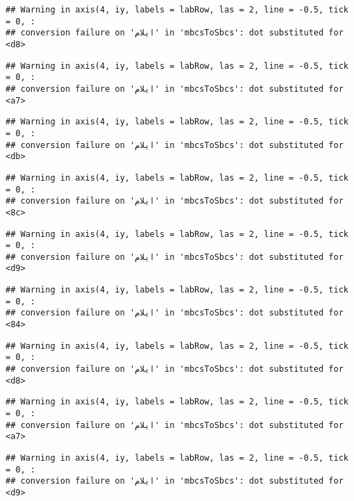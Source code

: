 \documentclass[
]{article}
\begin{document}
\begin{verbatim}
## Warning in axis(4, iy, labels = labRow, las = 2, line = -0.5, tick = 0, :
## conversion failure on 'ایلام' in 'mbcsToSbcs': dot substituted for <d8>
\end{verbatim}

\begin{verbatim}
## Warning in axis(4, iy, labels = labRow, las = 2, line = -0.5, tick = 0, :
## conversion failure on 'ایلام' in 'mbcsToSbcs': dot substituted for <a7>
\end{verbatim}

\begin{verbatim}
## Warning in axis(4, iy, labels = labRow, las = 2, line = -0.5, tick = 0, :
## conversion failure on 'ایلام' in 'mbcsToSbcs': dot substituted for <db>
\end{verbatim}

\begin{verbatim}
## Warning in axis(4, iy, labels = labRow, las = 2, line = -0.5, tick = 0, :
## conversion failure on 'ایلام' in 'mbcsToSbcs': dot substituted for <8c>
\end{verbatim}

\begin{verbatim}
## Warning in axis(4, iy, labels = labRow, las = 2, line = -0.5, tick = 0, :
## conversion failure on 'ایلام' in 'mbcsToSbcs': dot substituted for <d9>
\end{verbatim}

\begin{verbatim}
## Warning in axis(4, iy, labels = labRow, las = 2, line = -0.5, tick = 0, :
## conversion failure on 'ایلام' in 'mbcsToSbcs': dot substituted for <84>
\end{verbatim}

\begin{verbatim}
## Warning in axis(4, iy, labels = labRow, las = 2, line = -0.5, tick = 0, :
## conversion failure on 'ایلام' in 'mbcsToSbcs': dot substituted for <d8>
\end{verbatim}

\begin{verbatim}
## Warning in axis(4, iy, labels = labRow, las = 2, line = -0.5, tick = 0, :
## conversion failure on 'ایلام' in 'mbcsToSbcs': dot substituted for <a7>
\end{verbatim}

\begin{verbatim}
## Warning in axis(4, iy, labels = labRow, las = 2, line = -0.5, tick = 0, :
## conversion failure on 'ایلام' in 'mbcsToSbcs': dot substituted for <d9>
\end{verbatim}
\end{document}
